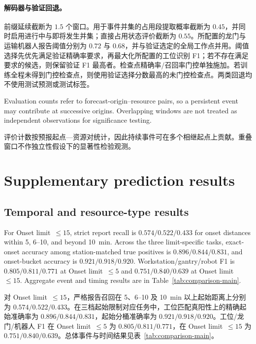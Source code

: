 \documentclass[a4paper,fleqn]{cas-dc}
\newcommand{\zhpara}[1]{%
  \par\begingroup\small\color{black!72}\noindent #1\par\endgroup}
\begin{document}
\zhpara{\paragraph{解码器与验证回退。}
前缀延续截断为 $1.5$ 个窗口。用于事件并集的占用段提取概率截断为 $0.45$，并同时启用进行中与即将发生并集；直接占用状态评价截断为 $0.55$。所配置的龙门与运输机器人报告阈值分别为 $0.72$ 与 $0.68$，并与验证选定的全局工作点并用。阈值选择先优先满足验证精确率要求，再最大化所配置的工位识别 F1；若不存在满足要求的候选，则保留验证 F1 最高者。检查点精确率/召回率门控单独施加。若训练全程未得到门控检查点，则使用验证选择分数最高的未门控检查点。两类回退均不使用测试预测或测试标签。}


Evaluation counts refer to forecast-origin--resource pairs, so a persistent event may contribute at successive origins. Overlapping windows are not treated as independent observations for significance testing.

\zhpara{评价计数按预报起点—资源对统计，因此持续事件可在多个相继起点上贡献。重叠窗口不作独立性假设下的显著性检验观测。}


\section{Supplementary prediction results}\label{app:supplementary-results}

\subsection{Temporal and resource-type results}



For Onset limit~$\leq15$, strict report recall is $0.574/0.522/0.433$ for onset distances within 5, 6--10, and beyond 10~min. Across the three limit-specific tasks, exact-onset accuracy among station-matched true positives is $0.896/0.844/0.831$, and onset-bucket accuracy is $0.921/0.918/0.920$. Workstation/gantry/robot F1 is $0.805/0.811/0.771$ at Onset limit~$\leq5$ and $0.751/0.840/0.639$ at Onset limit~$\leq15$. Aggregate event and timing results are in Table~\ref{tab:comparison-main}.

\zhpara{对 Onset limit~$\leq15$，严格报告召回在 5、6--10 及 10~min 以上起始距离上分别为 $0.574/0.522/0.433$。在三档起始限制对应任务中，工位匹配真阳性上的精确起始准确率为 $0.896/0.844/0.831$，起始分桶准确率为 $0.921/0.918/0.920$。工位/龙门/机器人 F1 在 Onset limit~$\leq5$ 为 $0.805/0.811/0.771$，在 Onset limit~$\leq15$ 为 $0.751/0.840/0.639$。总体事件与时间结果见表~\ref{tab:comparison-main}。}
\end{document}
